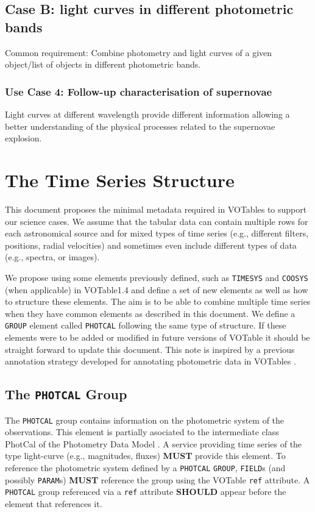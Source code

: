 \documentclass[11pt,a4paper]{ivoa}
\let\fg=\color
\def\attr#1{{\tt{\fg{DarkRed}#1}}}
\def\elem#1{{\tt{\fg{DarkRed}#1}}}
\begin{document}
\subsection{Case B: light curves in different photometric bands}
Common requirement: Combine photometry and light curves of a given object/list of objects in different photometric bands.

\subsubsection{Use Case 4: Follow-up characterisation of supernovae}
Light curves at different wavelength provide different information allowing a better understanding of the physical processes related to the supernovae explosion.

\section{The Time Series Structure}
\label{elem:TIMESERIES}
This document proposes the minimal metadata required in VOTables to support our science cases. We assume that the tabular data can contain multiple rows for each astronomical source and for mixed types of time series (e.g., different filters, positions, radial velocities) and sometimes even include different types of data (e.g., spectra, or images). 

We propose using some elements previously defined, such as \elem{TIMESYS} and \elem{COOSYS} (when applicable) in VOTable1.4 \citet{std:VOTABLE1.4} and define a set of new elements as well as how to structure these elements. The aim is to be able to combine multiple time series when they have common elements as described in this document. We define a \elem{GROUP} element called \texttt{PHOTCAL} following the same type of structure. If these elements were to be added or modified in future versions of VOTable it should be straight forward to update this document. This note is inspired by a previous annotation strategy developed for annotating photometric data in VOTables \citep{note:seb2010-1}.

%
%

\subsection{The \texttt{PHOTCAL} Group}
The \texttt{PHOTCAL} group contains information on the photometric system of the observations. This element is partially asociated to the intermediate class PhotCal of the Photometry Data Model \citep{std:PDM}. A service providing time series of the type light-curve (e.g., magnitudes, fluxes) \textbf{MUST} provide this element. To reference the photometric system defined by a \texttt{PHOTCAL} \elem{GROUP}, \elem{FIELD}s (and possibly \elem{PARAM}s) \textbf{MUST} reference the group using the VOTable \attr{ref} attribute. A \texttt{PHOTCAL} group referenced via a \attr{ref} attribute \textbf{SHOULD} appear before the element that references it. 
\end{document}
